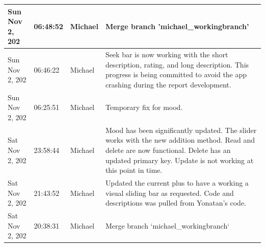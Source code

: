 \documentclass[11pt]{article}
\begin{document}
\begin{center}
\begin{longtable}{|p{2.7cm}|l|p{2cm}|p{8cm}|}
           \hline Sun Nov 2,  202                              & 06:48:52                           & Michael                                 & Merge branch 'michael\_workingbranch'                                                                                                                                                                                                                                                                       \\
           \hline Sun Nov 2,  202                              & 06:46:22                           & Michael                                 & Seek bar is now working with the short description, rating, and long description. This progress is being committed to avoid the app crashing during the report development.                                                                                                                                \\
           \hline Sun Nov 2,  202                              & 06:25:51                           & Michael                                 & Temporary fix for mood.                                                                                                                                                                                                                                                                                    \\
           \hline Sat Nov 2,  202                              & 23:58:44                           & Michael                                 & Mood has been significantly updated. The slider works with the new addition method. Read and delete are now functional. Delete has an updated primary key. Update is not working at this point in time.                                                                                                    \\
           \hline Sat Nov 2,  202                              & 21:43:52                           & Michael                                 & Updated the current plus to have a working a visual sliding bar as requested. Code and descriptions was pulled from Yonatan's code.                                                                                                                                                                        \\
           \hline Sat Nov 2,  202                              & 20:38:31                           & Michael                                 & Merge branch `michael\_workingbranch`                                                                                                                                                                                                                                                                       \\

\end{longtable}
\end{center}
\end{document}
